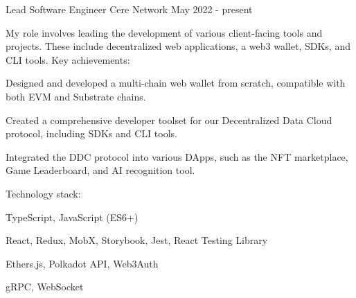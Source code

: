 

\begin{cventries}


  \cventry
    {Lead Software Engineer} %
    {Cere Network} %
    {} %
    {May 2022 - present} %
    {
      My role involves leading the development of various client-facing tools and projects. These include decentralized web applications, a web3 wallet, SDKs, and CLI tools.
      \newline
      \vspace{2mm}
      Key achievements:
      \vspace{4mm}
      \begin{cvitems}
        \item Designed and developed a multi-chain web wallet from scratch, compatible with both EVM and Substrate chains.
        \item Created a comprehensive developer toolset for our Decentralized Data Cloud protocol, including SDKs and CLI tools.
        \item Integrated the DDC protocol into various DApps, such as the NFT marketplace, Game Leaderboard, and AI recognition tool.
      \end{cvitems}
      \vspace{5mm}
      Technology stack:
      \begin{cvstackitems}
        \item TypeScript, JavaScript (ES6+)
        \item React, Redux, MobX, Storybook, Jest, React Testing Library
        \item Ethers.js, Polkadot API, Web3Auth
        \item gRPC, WebSocket
      \end{cvstackitems}
    }


\end{cventries}
